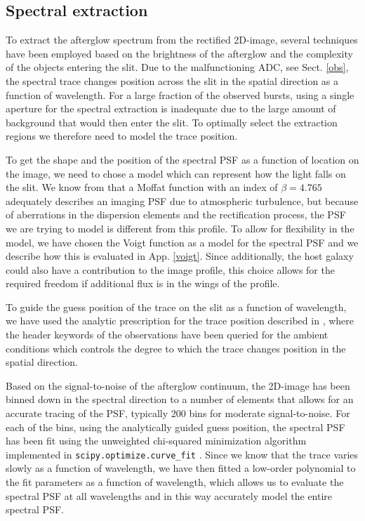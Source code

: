 \documentclass{aa}    %
\begin{document}
\subsection{Spectral extraction}    \label{extract}

To extract the afterglow spectrum from the rectified 2D-image, several
techniques have been employed based on the brightness of the afterglow and the
complexity of the objects entering the slit. Due to the malfunctioning ADC, see
Sect. \ref{obs}, the spectral trace changes position across the slit in the
spatial direction as a function of wavelength. For a large fraction of the
observed bursts, using a single aperture for the spectral extraction is
inadequate due to the large amount of background that would then enter the slit.
To optimally select the extraction regions we therefore need to model the trace
position.

To get the shape and the position of the spectral PSF as a function of location
on the image, we need to chose a model which can represent how the light falls
on the slit. We know from \citet{Trujillo2001} that a Moffat function
\citep{Moffat1969} with an index of $\beta = 4.765$ adequately describes an
imaging PSF due to atmospheric turbulence, but because of aberrations in the
dispersion elements and the rectification process, the PSF we are trying to
model is different from this profile. To allow for flexibility in the model, we
have chosen the Voigt function as a model for the spectral PSF and we describe
how this is evaluated in App. \ref{voigt}. Since additionally, the host galaxy
could also have a contribution to the image profile, this choice allows for the
required freedom if additional flux is in the wings of the profile.

To guide the guess position of the trace on the slit as a function of
wavelength, we have used the analytic prescription for the trace position
described in \citet{Filippenko1982}, where the header keywords of the
observations have been queried for the ambient conditions which controls the
degree to which the trace changes position in the spatial direction.

Based on the signal-to-noise of the afterglow continuum, the 2D-image has been
binned down in the spectral direction to a number of elements that allows for an
accurate tracing of the PSF, typically 200 bins for moderate signal-to-noise.
For each of the bins, using the analytically guided guess position, the spectral
PSF has been fit using the unweighted chi-squared minimization algorithm
implemented in \texttt{scipy.optimize.curve\_fit} \citep{scipy}. Since we know
that the trace varies slowly as a function of wavelength, we have then fitted a
low-order polynomial to the fit parameters as a function of wavelength, which
allows us to evaluate the spectral PSF at all wavelengths and in this way
accurately model the entire spectral PSF.
\end{document}
